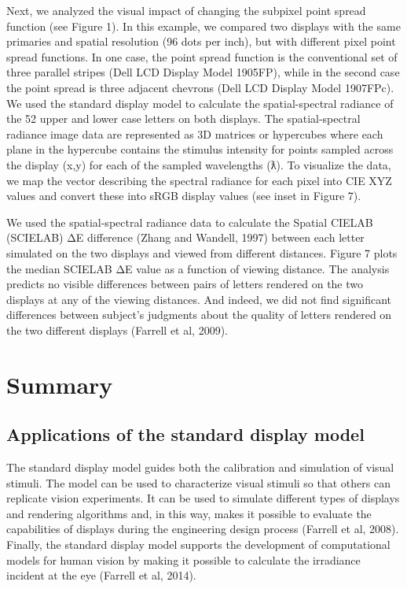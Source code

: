 \documentclass[
  letterpaper,
]{book}
\begin{document}
Next, we analyzed the visual impact of changing the subpixel point
spread function (see Figure 1). In this example, we compared two
displays with the same primaries and spatial resolution (96 dots per
inch), but with different pixel point spread functions. In one case, the
point spread function is the conventional set of three parallel stripes
(Dell LCD Display Model 1905FP), while in the second case the point
spread is three adjacent chevrons (Dell LCD Display Model 1907FPc). We
used the standard display model to calculate the spatial-spectral
radiance of the 52 upper and lower case letters on both displays. The
spatial-spectral radiance image data are represented as 3D matrices or
hypercubes where each plane in the hypercube contains the stimulus
intensity for points sampled across the display (x,y) for each of the
sampled wavelengths (ƛ). To visualize the data, we map the vector
describing the spectral radiance for each pixel into CIE XYZ values and
convert these into sRGB display values (see inset in Figure 7).

We used the spatial-spectral radiance data to calculate the Spatial
CIELAB (SCIELAB) ΔE difference (Zhang and Wandell, 1997) between each
letter simulated on the two displays and viewed from different
distances. Figure 7 plots the median SCIELAB ΔE value as a function of
viewing distance. The analysis predicts no visible differences between
pairs of letters rendered on the two displays at any of the viewing
distances. And indeed, we did not find significant differences between
subject's judgments about the quality of letters rendered on the two
different displays (Farrell et al, 2009).

\section{Summary}\label{summary}

\subsection{\texorpdfstring{\textbf{Applications of the standard display
model}}{Applications of the standard display model}}\label{applications-of-the-standard-display-model}

The standard display model guides both the calibration and simulation of
visual stimuli. The model can be used to characterize visual stimuli so
that others can replicate vision experiments. It can be used to simulate
different types of displays and rendering algorithms and, in this way,
makes it possible to evaluate the capabilities of displays during the
engineering design process (Farrell et al, 2008). Finally, the standard
display model supports the development of computational models for human
vision by making it possible to calculate the irradiance incident at the
eye (Farrell et al, 2014).
\end{document}

